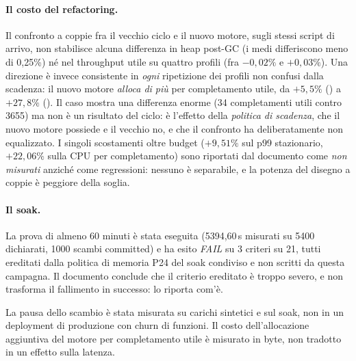 \paragraph{Il costo del refactoring.} Il confronto a coppie fra il vecchio ciclo e il
nuovo motore, sugli stessi script di arrivo, non stabilisce alcuna differenza in
heap post-GC (i medi differiscono meno di 0,25\%) n\'e nel throughput utile su quattro
profili (fra $-0{,}02\%$ e $+0{,}03\%$). Una direzione \`e invece consistente in
\emph{ogni} ripetizione dei profili non confusi dalla scadenza: il nuovo motore
\emph{alloca di pi\`u} per completamento utile, da $+5{,}5\%$ () a
$+27{,}8\%$ (). Il caso  mostra una differenza
enorme (34 completamenti utili contro 3655) ma non \`e un risultato del ciclo: \`e
l'effetto della \emph{politica di scadenza}, che il nuovo motore possiede e il
vecchio no, e che il confronto ha deliberatamente non equalizzato. I singoli
scostamenti oltre budget ($+9{,}51\%$ sul p99 stazionario, $+22{,}06\%$ sulla CPU
per completamento) sono riportati dal documento come \emph{non misurati} anzich\'e
come regressioni: nessuno \`e separabile, e la potenza del disegno a coppie \`e
peggiore della soglia.

\paragraph{Il soak.} La prova di almeno 60 minuti \`e stata eseguita
(5394,60\,s misurati su 5400 dichiarati, 1000 scambi committed) e ha esito
\emph{FAIL} su 3 criteri su 21, tutti ereditati dalla politica di memoria P24 del
soak condiviso e non scritti da questa campagna. Il documento conclude che il
criterio ereditato \`e troppo severo, e non trasforma il fallimento in successo: lo
riporta com'\`e.

\begin{damisurare}
La pausa dello scambio \`e stata misurata su carichi sintetici e sul soak, non in un
deployment di produzione con churn di funzioni. Il costo dell'allocazione aggiuntiva
del motore per completamento utile \`e misurato in byte, non tradotto in un effetto
sulla latenza.
\end{damisurare}
